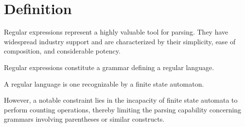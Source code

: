 \section{Definition}

Regular expressions represent a highly valuable tool for parsing.
They have widespread industry support and are characterized by their simplicity, ease of composition, and considerable potency.
\begin{definition}
    Regular expressions constitute a grammar defining a regular language.
\end{definition}
\begin{definition}
    A regular language is one recognizable by a finite state automaton.
\end{definition}
However, a notable constraint lies in the incapacity of finite state automata to perform counting operations, thereby limiting the parsing capability concerning grammars involving parentheses or similar constructs.